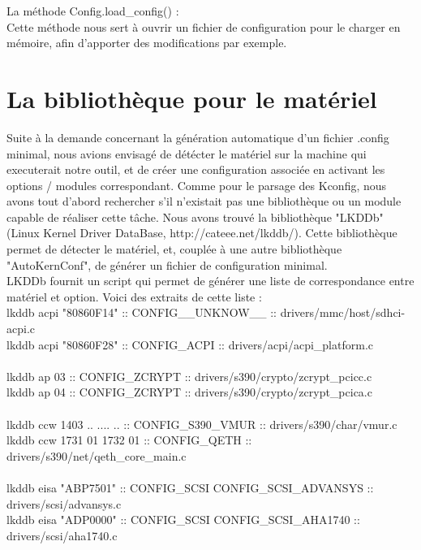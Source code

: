 \documentclass[16pts]{report}
\begin{document}
    La méthode Config.load\_config() :\\

        Cette méthode nous sert à ouvrir un fichier de configuration pour le charger
        en mémoire, afin d'apporter des modifications par exemple.\\


    \section{La bibliothèque pour le matériel}
    \label{sec:La bibliothèque pour le matériel}

    Suite à la demande concernant la génération automatique d'un fichier .config 
    minimal, nous avions envisagé de détécter le matériel sur la machine 
    qui executerait notre outil, et de créer une configuration associée en activant
    les options / modules correspondant. Comme pour le parsage des Kconfig, nous 
    avons tout d'abord rechercher s'il n'existait pas une bibliothèque ou un module
    capable de réaliser cette tâche. Nous avons trouvé la bibliothèque "LKDDb" (Linux 
    Kernel Driver DataBase, http://cateee.net/lkddb/). Cette bibliothèque permet de 
    détecter le matériel, et, couplée à une autre bibliothèque "AutoKernConf", de 
    générer un fichier de configuration minimal. \\

    LKDDb fournit un script qui permet de générer une liste de correspondance entre 
    matériel et option. Voici des extraits de cette liste : \\

    lkddb acpi "80860F14" :: CONFIG__UNKNOW__ :: drivers/mmc/host/sdhci-acpi.c \\
    lkddb acpi "80860F28" :: CONFIG_ACPI :: drivers/acpi/acpi_platform.c \\
    [...] \\
    lkddb ap 03 :: CONFIG_ZCRYPT :: drivers/s390/crypto/zcrypt_pcicc.c \\
    lkddb ap 04 :: CONFIG_ZCRYPT :: drivers/s390/crypto/zcrypt_pcica.c \\
    [...] \\
    lkddb ccw 1403 .. .... .. :: CONFIG_S390_VMUR :: drivers/s390/char/vmur.c \\
    lkddb ccw 1731 01 1732 01 :: CONFIG_QETH :: drivers/s390/net/qeth_core_main.c \\
    [...] \\
    lkddb eisa "ABP7501" :: CONFIG_SCSI CONFIG_SCSI_ADVANSYS :: drivers/scsi/advansys.c \\
    lkddb eisa "ADP0000" :: CONFIG_SCSI CONFIG_SCSI_AHA1740 :: drivers/scsi/aha1740.c \\
\end{document}
